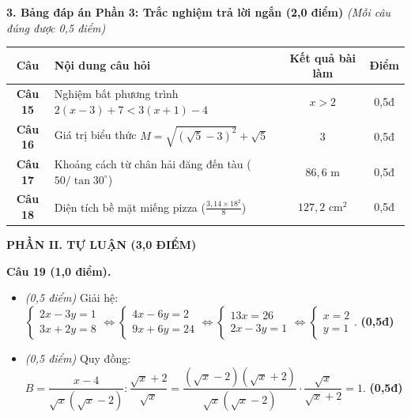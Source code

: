 \documentclass[11pt,a4paper]{article}
\begin{document}
\vspace{2mm}
\noindent
\textbf{3. Bảng đáp án Phần 3: Trắc nghiệm trả lời ngắn (2,0 điểm)} \textit{(Mỗi câu đúng được 0,5 điểm)}
\begin{center}
\begin{tabular}{|c|l|c|c|}
\hline
\textbf{Câu} & \textbf{Nội dung câu hỏi} & \textbf{Kết quả bài làm} & \textbf{Điểm} \\
\hline
\textbf{Câu 15} & Nghiệm bất phương trình $2(x - 3) + 7 < 3(x + 1) - 4$ & \textbf{$x > 2$} & 0,5đ \\
\hline
\textbf{Câu 16} & Giá trị biểu thức $M = \sqrt{(\sqrt{5}-3)^2} + \sqrt{5}$ & \textbf{$3$} & 0,5đ \\
\hline
\textbf{Câu 17} & Khoảng cách từ chân hải đăng đến tàu ($50 / \tan 30^\circ$) & \textbf{$86{,}6\text{ m}$} & 0,5đ \\
\hline
\textbf{Câu 18} & Diện tích bề mặt miếng pizza ($\frac{3{,}14 \times 18^2}{8}$) & \textbf{$127{,}2\text{ cm}^2$} & 0,5đ \\
\hline
\end{tabular}
\end{center}

\vspace{3mm}
\noindent
\textbf{\large PHẦN II. TỰ LUẬN (3,0 ĐIỂM)}

\vspace{2mm}
\textbf{Câu 19 (1,0 điểm).}
\begin{itemize}
  \item[a)] \textit{(0,5 điểm)} Giải hệ: $\begin{cases} 2x - 3y = 1 \\ 3x + 2y = 8 \end{cases} \Leftrightarrow \begin{cases} 4x - 6y = 2 \\ 9x + 6y = 24 \end{cases} \Leftrightarrow \begin{cases} 13x = 26 \\ 2x - 3y = 1 \end{cases} \Leftrightarrow \begin{cases} x = 2 \\ y = 1 \end{cases}$. \hfill \textbf{(0,5đ)}
  \item[b)] \textit{(0,5 điểm)} Quy đồng: $B = \dfrac{x - 4}{\sqrt{x}(\sqrt{x}-2)} : \dfrac{\sqrt{x}+2}{\sqrt{x}} = \dfrac{(\sqrt{x}-2)(\sqrt{x}+2)}{\sqrt{x}(\sqrt{x}-2)} \cdot \dfrac{\sqrt{x}}{\sqrt{x}+2} = 1$. \hfill \textbf{(0,5đ)}
\end{itemize}
\end{document}
